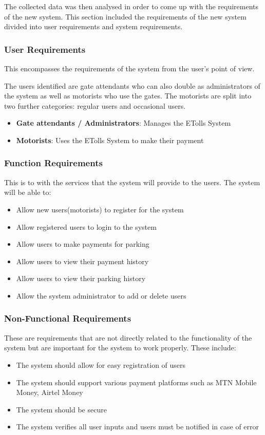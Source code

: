 The collected data was then analysed in order to come up with the requirements of the new system. This section included the requirements of the new system divided into user requirements and system requirements.

\subsubsection{User Requirements}
This encompasses the requirements of the system from the user’s point of view.

The users identified are gate attendants who can also double as administrators of the system as well as motorists who use the gates. The motorists are split into two further categories: regular users and occasional users.
\begin{itemize}
    \item \textbf{Gate attendants / Administrators}: Manages the ETolls System
    \item \textbf{Motorists}: Uses the ETolls System to make their payment
\end{itemize}

\subsubsection{Function Requirements}
This is to with the services that the system will provide to the users. The system will be able to:
\begin{itemize}
    \item Allow new users(motorists) to register for the system
    \item Allow registered users to login to the system
    \item Allow users to make payments for parking
    \item Allow users to view their payment history
    \item Allow users to view their parking history
    \item Allow the system administrator to add or delete users
\end{itemize}

\subsubsection{Non-Functional Requirements}
These are requirements that are not directly related to the functionality of the system but are important for the system to work properly. These include:
\begin{itemize}
    \item The system should allow for easy registration of users
    \item The system should support various payment platforms such as MTN Mobile Money, Airtel Money
    \item The system should be secure
    \item The system verifies all user inputs and users must be notified in case of error
\end{itemize}

